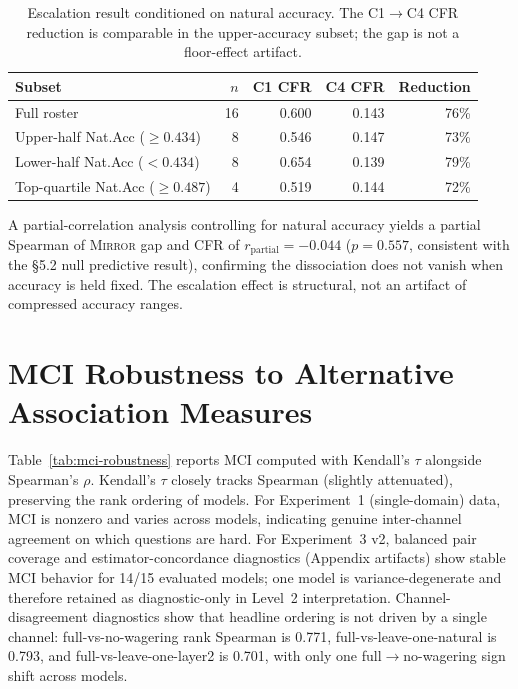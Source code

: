 \documentclass[10pt]{article}
\newcommand{\mirror}{\textsc{Mirror}}
\newcommand{\CFR}{CFR}
\begin{document}
\begin{table}[h]
\centering
\caption{Escalation result conditioned on natural accuracy. The C1$\to$C4 \CFR{} reduction is comparable in the upper-accuracy subset; the gap is not a floor-effect artifact.}
\label{tab:floor-effect}
\small
\begin{tabular}{lrrrr}
\toprule
Subset & $n$ & C1 \CFR{} & C4 \CFR{} & Reduction \\
\midrule
Full roster                          & 16 & 0.600 & 0.143 & 76\% \\
Upper-half Nat.Acc ($\geq 0.434$)    &  8 & 0.546 & 0.147 & 73\% \\
Lower-half Nat.Acc ($< 0.434$)       &  8 & 0.654 & 0.139 & 79\% \\
Top-quartile Nat.Acc ($\geq 0.487$)  &  4 & 0.519 & 0.144 & 72\% \\
\bottomrule
\end{tabular}
\end{table}

A partial-correlation analysis controlling for natural accuracy yields a partial Spearman of \mirror{} gap and \CFR{} of $r_{\text{partial}} = -0.044$ ($p = 0.557$, consistent with the §5.2 null predictive result), confirming the dissociation does not vanish when accuracy is held fixed. The escalation effect is structural, not an artifact of compressed accuracy ranges.

\section{MCI Robustness to Alternative Association Measures}
\label{app:mci-robust}

Table~\ref{tab:mci-robustness} reports MCI computed with Kendall's $\tau$ alongside Spearman's $\rho$. Kendall's $\tau$ closely tracks Spearman (slightly attenuated), preserving the rank ordering of models. For Experiment~1 (single-domain) data, MCI is nonzero and varies across models, indicating genuine inter-channel agreement on which questions are hard. For Experiment~3 v2, balanced pair coverage and estimator-concordance diagnostics (Appendix artifacts) show stable MCI behavior for 14/15 evaluated models; one model is variance-degenerate and therefore retained as diagnostic-only in Level~2 interpretation. Channel-disagreement diagnostics show that headline ordering is not driven by a single channel: full-vs-no-wagering rank Spearman is 0.771, full-vs-leave-one-natural is 0.793, and full-vs-leave-one-layer2 is 0.701, with only one full$\rightarrow$no-wagering sign shift across models.
\end{document}
